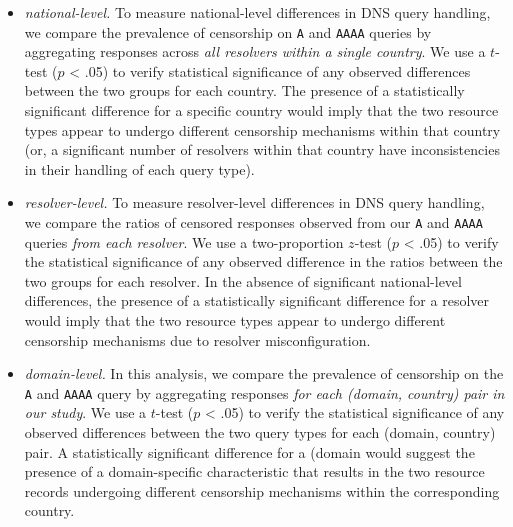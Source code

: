 \begin{itemize}
  \item {\it national-level.} To measure national-level differences in DNS query
    handling, we compare the prevalence of censorship on {\tt A} and {\tt AAAA}
    queries by aggregating responses across \emph{all resolvers within a single
    country}.
    We use a $t$-test ($p$ < .05) to verify statistical significance of any
    observed differences between the two groups for each country. The presence
    of a statistically significant difference for a specific country would
    imply that the two resource types appear to undergo different censorship
    mechanisms within that country (or, a significant number of resolvers
    within that country have inconsistencies in their handling of each query
    type).

  \item {\it resolver-level.} To measure resolver-level differences in DNS
    query handling, we compare the ratios of censored responses observed from
    our {\tt A} and {\tt AAAA} queries \emph{from each resolver}. 
    We use a two-proportion $z$-test ($p$ < .05) to verify the statistical
    significance of any observed difference in the ratios between the two
    groups for each resolver. In the absence of significant national-level
    differences, the presence of a statistically significant difference for
    a resolver would imply that the two resource types appear to undergo
    different censorship mechanisms due to resolver misconfiguration.

  \item {\it domain-level.} In this analysis, we compare the prevalence of
    censorship on the {\tt A} and {\tt AAAA} query by aggregating responses
    \emph{for each (domain, country) pair in our study}.
    We use a $t$-test ($p$ < .05) to verify the statistical significance of any
    observed differences between the two query types for each (domain, country)
    pair. A statistically significant difference for a (domain would suggest
    the presence of a domain-specific characteristic that results in the two
    resource records undergoing different censorship mechanisms within the
    corresponding country.
\end{itemize}


